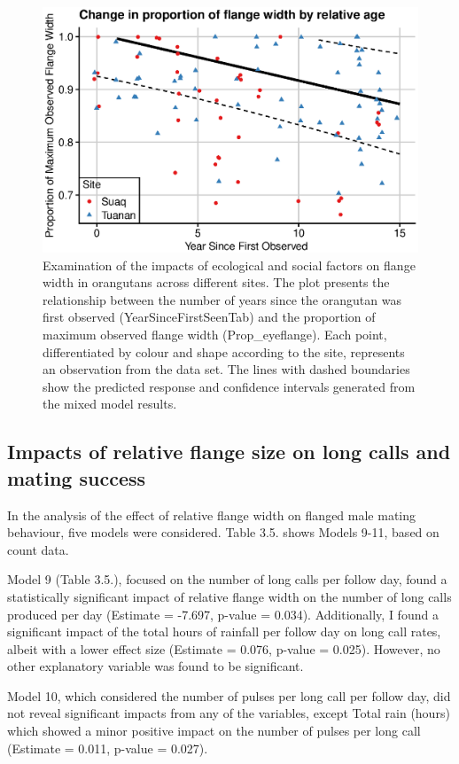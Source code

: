 \begin{figure}
\centering
\includegraphics[width=0.8\linewidth]{Chapter3/Figs/flange_width.eps}
\caption{Examination of the impacts of ecological and social factors on flange width in orangutans across different sites. The plot presents the relationship between the number of years since the orangutan was first observed (YearSinceFirstSeenTab) and the proportion of maximum observed flange width (Prop\_eyeflange). Each point, differentiated by colour and shape according to the site, represents an observation from the data set. The lines with dashed boundaries show the predicted response and confidence intervals generated from the mixed model results.}
\label{fig:enter-label}
\end{figure}
\subsection{Impacts of relative flange size on long calls and mating success}

In the analysis of the effect of relative flange width on flanged male mating behaviour, five models were considered. Table 3.5. shows Models 9-11, based on count data.

Model 9 (Table 3.5.), focused on the number of long calls per follow day, found a statistically significant impact of relative flange width on the number of long calls produced per day (Estimate = -7.697, p-value = 0.034). Additionally, I found a significant impact of the total hours of rainfall per follow day on long call rates, albeit with a lower effect size (Estimate = 0.076, p-value = 0.025). However, no other explanatory variable was found to be significant.

 Model 10, which considered the number of pulses per long call per follow day, did not reveal significant impacts from any of the variables, except Total rain (hours) which showed a minor positive impact on the number of pulses per long call (Estimate = 0.011, p-value = 0.027).
 
